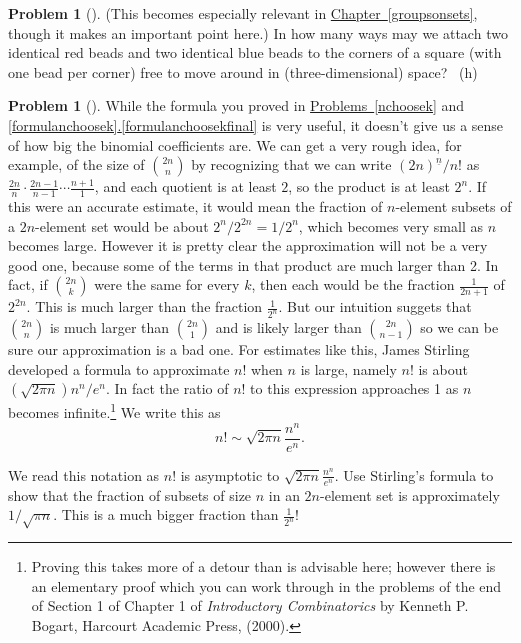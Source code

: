 \documentclass[10pt,]{book}
\theoremstyle{plain}
\theoremstyle{definition}
\newtheorem{activity}[project]{Problem}
\theoremstyle{definition}
\numberwithin{equation}{chapter}
\newcommand{\importantarrow}{\Rightarrow}
\begin{document}
\begin{activity}[] \label{twocolorsofbeads}
\hypertarget{p-264}{}%
(This becomes especially relevant in \hyperref[groupsonsets]{Chapter~\ref{groupsonsets}}, though it makes an important point here.) In how many ways may we attach two identical red beads and two identical blue beads to the corners of a square (with one bead per corner) free to move around in (three-dimensional) space?%
~{\tiny (h)}\end{activity}
\begin{activity}[]\marginsymbol[-1em]{\pdftooltip{$\importantarrow$}{especially interesting}} \label{Stirling_sapproximation}
\hypertarget{p-267}{}%
While the formula you proved in \hyperref[nchoosek]{Problems~\ref{nchoosek}} and \hyperref[formulanchoosekfinal]{\ref{formulanchoosek}.\ref{formulanchoosekfinal}} is very useful, it doesn't give us a sense of how big the binomial coefficients are. We can get a very rough idea, for example, of the size of \(\binom{2n}{n}\) by recognizing that we can write \((2n)^{\underline{n}}/n!\) as \(\frac{2n}{n}\cdot
\frac{2n-1}{n-1}\cdots \frac{n+1}{1}\), and each quotient is at least \(2\), so the product is at least \(2^n\). If this were an accurate estimate, it would mean the fraction of \(n\)-element subsets of a \(2n\)-element set would be about         \(2^n/2^{2n}=1/2^n\), which becomes very small as \(n\) becomes large. However it is pretty clear the approximation will not be a very good one, because some of the terms in that product are much larger than 2. In fact, if \(\binom{2n}{k}\) were the same for every \(k\), then each would be the fraction \(\frac{1}{2n+1}\) of \(2^{2n}\). This is much larger than the fraction \(\frac{1}{2^n}\). But our intuition suggets that \(\binom{2n}{n}\) is much larger than \(\binom{2n}{1}\) and is likely larger than \(\binom{2n}{n-1}\) so we can be sure our approximation is a bad one. For estimates like this, James Stirling developed a formula to approximate \(n!\) when \(n\) is large, namely \(n!\) is about \(\left(\sqrt{2\pi
n}\right){n^n/ e^n}\). In fact the ratio of \(n!\) to this expression approaches 1 as \(n\) becomes infinite.\footnote{Proving this takes more of a detour than is advisable here; however there is an elementary proof which you can work through in the problems of the end of Section 1 of Chapter 1 of \emph{Introductory Combinatorics} by Kenneth P. Bogart, Harcourt Academic Press, (2000).\label{fn-2}} We write this as%
\begin{equation*}
n!\sim \sqrt{2\pi
n}\frac{n^n}{e^n}.
\end{equation*}
%
\par
\hypertarget{p-268}{}%
We read this notation as \(n!\) is asymptotic to \(\sqrt{2\pi n}\frac{n^n}{e^n}\). Use Stirling's formula to show that the fraction of subsets of size \(n\) in an \(2n\)-element set is approximately \(1/\sqrt{\pi n}\). This is a much bigger fraction than \(\frac{1}{2^n}\)!%
\end{activity}
\typeout{************************************************}
\typeout{************************************************}
\end{document}
